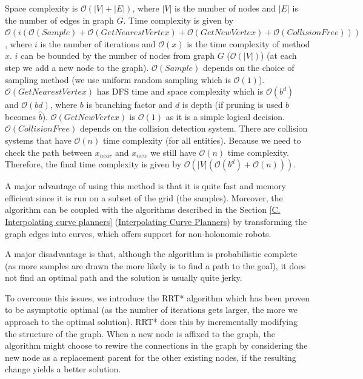 Space complexity is $\mathcal{O}(|V| + |E|)$, where $|V|$ is the number of nodes and $|E|$ is the number of edges in graph $G$. Time complexity is given by $\mathcal{O}(i (\mathcal{O}(Sample) + \mathcal{O}(GetNearestVertex) + \mathcal{O}(GetNewVertex) + \mathcal{O}(CollisionFree)))$, where $i$ is the number of iterations and $\mathcal{O}(x)$ is the time complexity of method $x$. $i$ can be bounded by the number of nodes from graph $G$ ($\mathcal{O}(|V|)$) (at each step we add a new node to the graph). $\mathcal{O}(Sample)$ depends on the choice of sampling method (we use uniform random sampling which is $\mathcal{O}(1)$). $\mathcal{O}(GetNearestVertex)$ has DFS time and space complexity which is $\mathcal{O}(b^d)$ and $\mathcal{O}(bd)$, where $b$ is branching factor and $d$ is depth (if pruning is used $b$ becomes $\hat{b}$). $\mathcal{O}(GetNewVertex)$ is $\mathcal{O}(1)$ as it is a simple logical decision. $\mathcal{O}(CollisionFree)$ depends on the collision detection system. There are collision systems that have $\mathcal{O}(n)$ time complexity (for all entities). Because we need to check the path between $x_{near}$ and $x_{new}$ we still have $\mathcal{O}(n)$ time complexity. Therefore, the final time complexity is given by $\mathcal{O}(|V|(\mathcal{O}(b^d) + \mathcal{O}(n)))$.

A major advantage of using this method is that it is quite fast and memory efficient since it is run on a subset of the grid (the samples). Moreover, the algorithm can be coupled with the algorithms described in the Section \ref {C. Interpolating curve planners} (\hyperref[C. Interpolating curve planners]{Interpolating Curve Planners}) by transforming the graph edges into curves, which offers support for non-holonomic robots.

A major disadvantage is that, although the algorithm is probabilistic complete (as more samples are drawn the more likely is to find a path to the goal), it does not find an optimal path and the solution is usually quite jerky.

To overcome this issues, we introduce the RRT* \cite{karaman2011sampling, gammell2014informed} algorithm which has been proven to be asymptotic optimal (as the number of iterations gets larger, the more we approach to the optimal solution). RRT* does this by incrementally modifying the structure of the graph. When a new node is affixed to the graph, the algorithm might choose to rewire the connections in the graph by considering the new node as a replacement parent for the other existing nodes, if the resulting change yields a better solution. 

